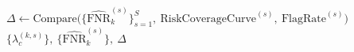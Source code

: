 \begin{algorithm}[t]
\BlankLine

$\Delta \leftarrow \mathrm{Compare}\!\bigl(\{\widehat{\mathrm{FNR}}_k^{(s)}\}_{s=1}^S,\ \mathrm{RiskCoverageCurve}^{(s)},\ \mathrm{FlagRate}^{(s)}\bigr)$\;
\Return $\bigl\{\lambda_c^{(k,s)}\bigr\},\ \bigl\{\widehat{\mathrm{FNR}}_k^{(s)}\bigr\},\ \Delta$

\end{algorithm}
